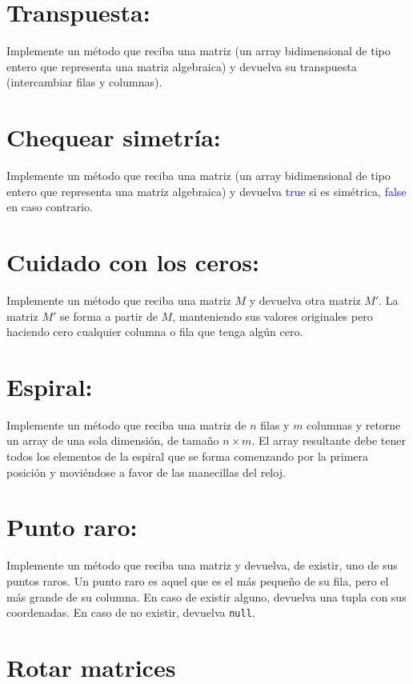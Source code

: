 \section{Transpuesta:}  
Implemente un método que reciba una matriz (un array bidimensional de tipo entero que representa una matriz algebraica) y devuelva su transpuesta (intercambiar filas y columnas).

\section{Chequear simetría:}  
Implemente un método que reciba una matriz (un array bidimensional de tipo entero que representa una matriz algebraica) y devuelva \textcolor{blue}{true} si es simétrica, \textcolor{blue}{false} en caso contrario.

\section{Cuidado con los ceros:}  
Implemente un método que reciba una matriz \(M\) y devuelva otra matriz \(M'\). La matriz \(M'\) se forma a partir de \(M\), manteniendo sus valores originales pero haciendo cero cualquier columna o fila que tenga algún cero.

\section{Espiral:}  
Implemente un método que reciba una matriz de \(n\) filas y \(m\) columnas y retorne un array de una sola dimensión, de tamaño \(n \times m\). El array resultante debe tener todos los elementos de la espiral que se forma comenzando por la primera posición y moviéndose a favor de las manecillas del reloj.

\section{Punto raro:}  
Implemente un método que reciba una matriz y devuelva, de existir, uno de sus puntos raros. Un punto raro es aquel que es el más pequeño de su fila, pero el más grande de su columna. En caso de existir alguno, devuelva una tupla con sus coordenadas. En caso de no existir, devuelva \texttt{null}.

\section{Rotar matrices}
	


